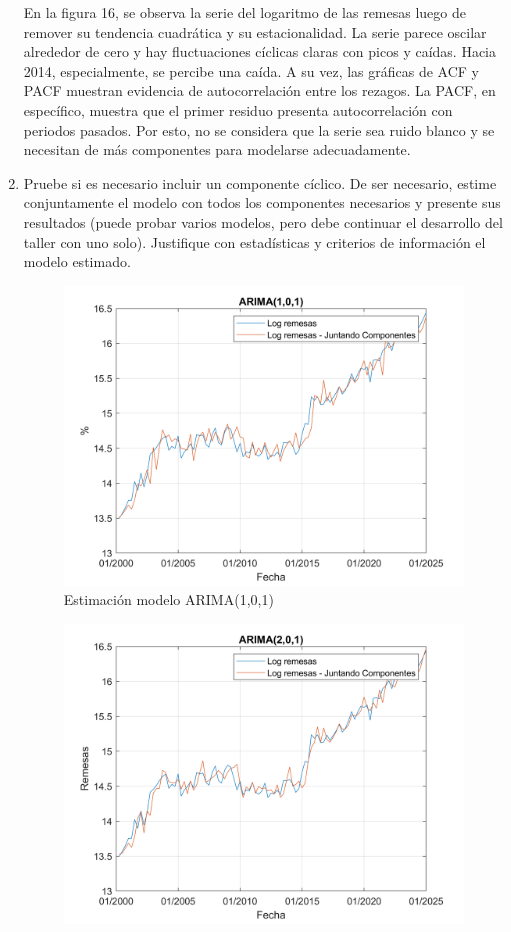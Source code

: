 \documentclass{article}
\theoremstyle{remark}
\theoremstyle{definition}
\begin{document}
\begin{enumerate}[label=\emph{\alph*})]
\begin{tcolorbox}[title=Soluci\'on 3.d]
             En la figura 16, se observa la serie del logaritmo de las remesas luego de  remover su tendencia cuadrática y su estacionalidad. La serie parece oscilar alrededor de cero y hay fluctuaciones cíclicas claras con picos y caídas. Hacia 2014, especialmente, se percibe una caída. A su vez, las gráficas de ACF y PACF muestran evidencia de autocorrelación entre los rezagos. La PACF, en específico, muestra que el primer residuo presenta autocorrelación con periodos pasados. Por esto, no se considera que la serie sea ruido blanco y se necesitan de más componentes para modelarse adecuadamente. 
        \end{tcolorbox}
    

    \item {Pruebe si es necesario incluir un componente c\'iclico. De ser necesario, estime conjuntamente el modelo con todos los componentes necesarios y presente sus resultados (puede probar varios modelos, pero debe continuar el desarrollo del taller con uno solo). Justifique con estad\'isticas y criterios de informaci\'on el modelo estimado.}
        \begin{tcolorbox}[title=Soluci\'on 3.e]
            \begin{figure}[H]
                \centering
                \includegraphics[width=0.5\linewidth]{docs/Arima_1_0_1.png}
                \caption{Estimación modelo ARIMA(1,0,1)}
                \label{fig:enter-label}
            \end{figure}
            \begin{figure}[H]
                \centering
                \includegraphics[width=0.5\linewidth]{docs/Arima_1_0_2.png}

\end{figure}
\end{tcolorbox}
\end{enumerate}
\end{document}
